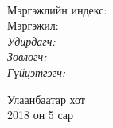 
\begin{titlepage}
\begin{center}

{\scshape\LARGE \univname\par} %
{\scshape\Large \facname\par}\vspace{0.5cm} %

\vspace{2cm}
\hfill \large{\deptname} \\

\vspace{2cm}

{\huge \bfseries \ttitle\par}\vspace{0.4cm} %
{\bfseries \tstitle\par} %

\vspace{2cm}

\begin{minipage}[t] {0.9\textwidth}
\begin{flushleft} 
\normalsize

Мэргэжлийн индекс: \degreeid \\
Мэргэжил: \degreename \\[2cm]

\emph{Удирдагч:} {\supname} \\%
\emph{Зөвлөгч:} {\advicename} \\ %
\emph{Гүйцэтгэгч:} {\shortname} \\ %

\end{flushleft}
\end{minipage}

\vfill

\large {Улаанбаатар хот} \\
{\large 2018 он 5 сар}\\ %

\end{center}
\end{titlepage}

 